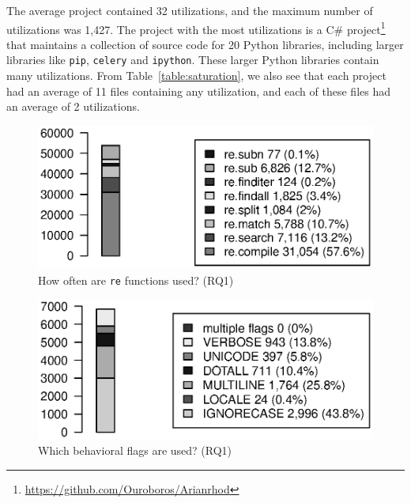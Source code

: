 The average project contained 32 utilizations, and the maximum number of utilizations was 1,427.  The project with the most utilizations is a C\# project\footnote{\url{https://github.com/Ouroboros/Arianrhod}} that maintains a collection of source code for 20 Python libraries, including larger libraries like {\tt pip}, {\tt celery} and {\tt ipython}.  These larger Python libraries contain many utilizations.
From Table~\ref{table:saturation}, we also see that each project had an average of 11 files containing any utilization, and each of these files had an average of 2 utilizations.







\begin{figure}[tb]
\centering
\includegraphics[width=\columnwidth]{../analysis_output/partFunctions.eps}
\vspace{-6pt}
\caption{How often are  {\tt re} functions used? (RQ1)}
\vspace{-6pt}
\label{fig:partFunctions}
\end{figure}

\begin{figure}[tb]
\centering
\includegraphics[width=0.9\columnwidth]{../analysis_output/partFlags.eps}
\vspace{-6pt}
\caption{Which behavioral flags are used? (RQ1)}
\label{fig:partFlags}
\end{figure}

